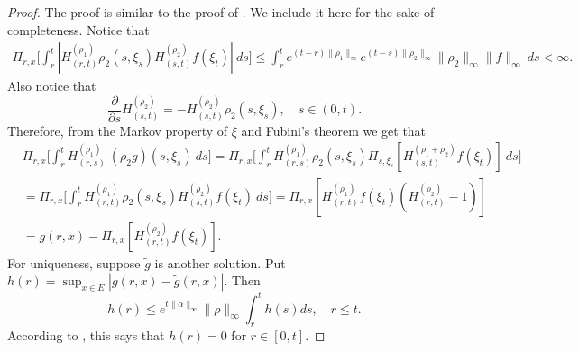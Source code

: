 \documentclass[12pt,a4paper]{amsart}
\theoremstyle{plain}
\theoremstyle{definition}
\numberwithin{equation}{section}
\begin{document}
\begin{proof}
    The proof is similar to the proof of \cite[Lemma A.1.5]{Dynkin1993Superprocesses}. We include it here for the sake of completeness.
    Notice that
\begin{equation}\begin{split}
   \Pi_{r,x} \Big[ \int_r^t | H_{(r,t)}^{(\rho_1)}\rho_2(s,\xi_s) H_{(s,t)}^{(\rho_2)} f(\xi_t)| ~ds \Big]
    \leq  \int_r^t e^{(t-r)\|\rho_1\|_\infty}e^{(t-s)\|\rho_2\|_\infty}\|\rho_2\|_\infty\|f\|_\infty ~ds
    < \infty.
\end{split}\end{equation}
    Also notice that
\begin{equation}
\label{eq: crucial for Feynman-Kac}
   \frac{\partial}{\partial s} H^{(\rho_2)}_{(s,t)}= -H^{(\rho_2)}_{(s,t)}\rho_2(s,\xi_s),
    \quad s\in (0,t).
\end{equation}
    Therefore, from the Markov property of $\xi$ and Fubini's theorem we get that
\begin{equation}\begin{split}
    &\Pi_{r,x} \Big[ \int_r^tH_{(r,s)}^{(\rho_1)}~(\rho_2 g)(s,\xi_s)~ds \Big]
    =\Pi_{r,x} \Big[ \int_r^t H_{(r,s)}^{(\rho_1)}\rho_2(s,\xi_s) \Pi_{s,\xi_s}[ H_{(s,t)}^{(\rho_1+\rho_2)} f(\xi_t)]~ds \Big]
    \\&= \Pi_{r,x} \Big[ \int_r^t H_{(r,t)}^{(\rho_1)}\rho_2(s,\xi_s) H_{(s,t)}^{(\rho_2)} f(\xi_t) ~ds \Big]
    = \Pi_{r,x} [ H_{(r,t)}^{(\rho_1)}f(\xi_t)(H_{(r,t)}^{(\rho_2)} - 1)]
    \\&= g(r,x) - \Pi_{r,x} [ H_{(r,t)}^{(\rho_2)} f(\xi_t)].
\end{split}\end{equation}
    For uniqueness, suppose  $\tilde g$ is another solution. Put $h(r) = \sup_{x\in E}|g(r,x) - \tilde g(r,x)|$. Then 
\[
    h(r) \leq e^{t\|\alpha\|_\infty}\|\rho\|_\infty \int_r^t h(s)ds,
    \quad r\le t.
\]
    According to \cite[Lemma A.1.5]{Dynkin1993Superprocesses}, this says that $h(r) =  0$ for $r\in [0,t]$.
\end{proof}
\end{document}
